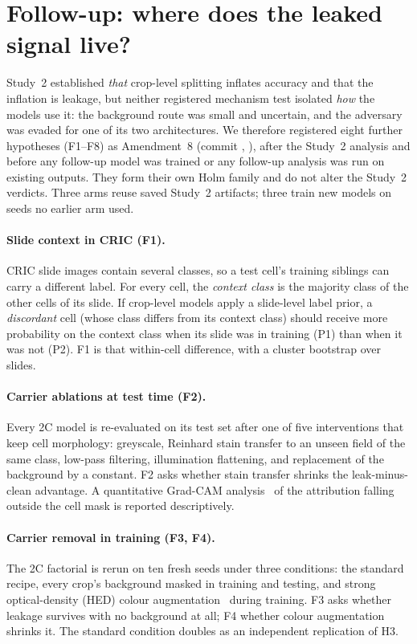 \section{Follow-up: where does the leaked signal live?}
\label{sec:followup}

Study~2 established \emph{that} crop-level splitting inflates accuracy and that the inflation is
leakage, but neither registered mechanism test isolated \emph{how} the models use it: the
background route was small and uncertain, and the adversary was evaded for one of its two
architectures. We therefore registered eight further hypotheses (F1--F8) as Amendment~8
(commit \texttt{\FollowupCommit}, \FollowupTime), after the Study~2 analysis and before any follow-up model was trained or any
follow-up analysis was run on existing outputs. They form their own Holm family and do not
alter the Study~2 verdicts. Three arms reuse saved Study~2 artifacts; three train new models
on seeds no earlier arm used.

\paragraph{Slide context in CRIC (F1).} CRIC slide images contain several classes, so a test
cell's training siblings can carry a different label. For every cell, the \emph{context class}
is the majority class of the other cells of its slide. If crop-level models apply a slide-level
label prior, a \emph{discordant} cell (whose class differs from its context class) should
receive more probability on the context class when its slide was in training (P1) than when it
was not (P2). F1 is that within-cell difference, with a cluster bootstrap over slides.

\paragraph{Carrier ablations at test time (F2).} Every 2C model is re-evaluated on its test set
after one of five interventions that keep cell morphology: greyscale, Reinhard stain transfer
to an unseen field of the same class, low-pass filtering, illumination flattening, and
replacement of the background by a constant. F2 asks whether stain transfer shrinks the
leak-minus-clean advantage. A quantitative Grad-CAM analysis~\citep{selvaraju2017gradcam} of the
attribution falling outside the cell mask is reported descriptively.

\paragraph{Carrier removal in training (F3, F4).} The 2C factorial is rerun on ten fresh seeds
under three conditions: the standard recipe, every crop's background masked in training and
testing, and strong optical-density (HED) colour augmentation~\citep{tellez2019quantifying}
during training. F3 asks whether leakage survives with no background at all; F4 whether
colour augmentation shrinks it. The standard condition doubles as an independent replication
of H3.

